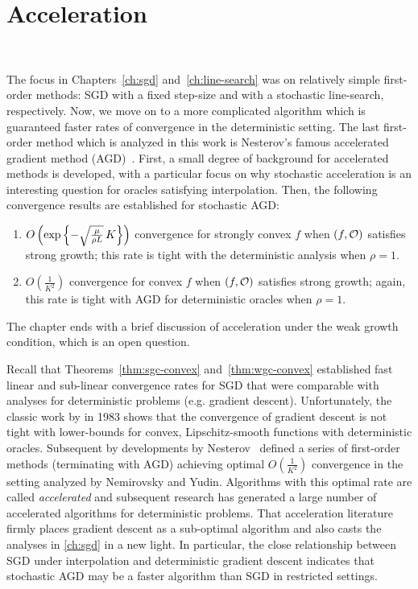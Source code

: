 
\chapter{Acceleration}~\label{ch:acceleration}

The focus in Chapters~\ref{ch:sgd} and~\ref{ch:line-search} was on relatively simple first-order methods: SGD with a fixed step-size and with a stochastic line-search, respectively.
Now, we move on to a more complicated algorithm which is guaranteed faster rates of convergence in the deterministic setting.
The last first-order method which is analyzed in this work is Nesterov's famous accelerated gradient method (AGD)~\cite[Eq. 2.2.20]{nesterov2004lectures}.
First, a small degree of background for accelerated methods is developed, with a particular focus on why stochastic acceleration is an interesting question for oracles satisfying interpolation.
Then, the following convergence results are established for stochastic AGD:
\begin{enumerate}
    \item \( O\rbr{\exp\cbr{- \sqrt{\frac{\mu}{\rho L}} \, K}} \) convergence for strongly convex \( f \) when \( \rbr{f, \oracle{}} \) satisfies strong growth; this rate is tight with the deterministic analysis when \( \rho = 1 \).
    \item \( O(\frac{1}{K^2}) \)  convergence for convex \( f \) when \( \rbr{f, \oracle{}} \) satisfies strong growth; again, this rate is tight with AGD for deterministic oracles when \( \rho = 1 \).
\end{enumerate}
The chapter ends with a brief discussion of acceleration under the weak growth condition, which is an open question.

Recall that Theorems~\ref{thm:sgc-convex} and~\ref{thm:wgc-convex} established fast linear and sub-linear convergence rates for SGD that were comparable with analyses for deterministic problems (e.g. gradient descent).
Unfortunately, the classic work by \citet{nemirovsky1983problem} in 1983 shows that the convergence of gradient descent is not tight with lower-bounds for convex, Lipschitz-smooth functions with deterministic oracles. 
Subsequent by developments by Nesterov~\citep{nesterov1983method, nemirovskii1985optimal, nesterov1988approach} defined a series of first-order methods (terminating with AGD) achieving optimal \( O(\frac{1}{K^2}) \) convergence in the setting analyzed by Nemirovsky and Yudin. 
Algorithms with this optimal rate are called \emph{accelerated} and subsequent research has generated a large number of accelerated algorithms for deterministic problems.
That acceleration literature firmly places gradient descent as a sub-optimal algorithm and also casts the analyses in \autoref{ch:sgd} in a new light.
In particular, the close relationship between SGD under interpolation and deterministic gradient descent indicates that stochastic AGD may be a faster algorithm than SGD in restricted settings. 

